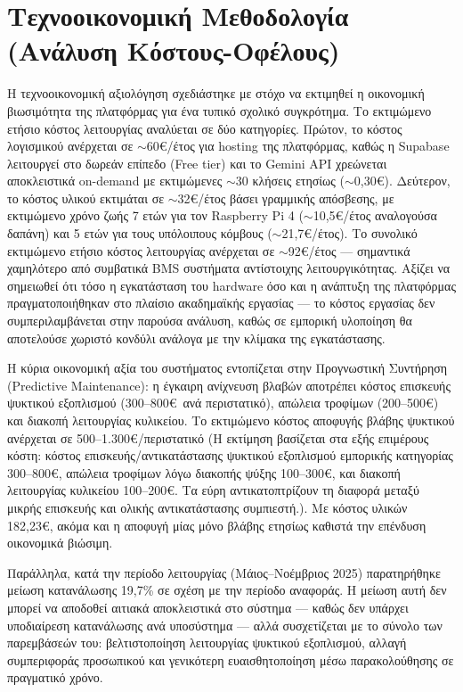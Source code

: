 \section{\texorpdfstring{Τεχνοοικονομική Μεθοδολογία (Ανάλυση Κόστους-Οφέλους)}{Τεχνοοικονομική Μεθοδολογία (Ανάλυση Κόστους-Οφέλους)}}
Η τεχνοοικονομική αξιολόγηση σχεδιάστηκε με στόχο να εκτιμηθεί η οικονομική βιωσιμότητα της πλατφόρμας για ένα τυπικό σχολικό συγκρότημα. Το εκτιμώμενο ετήσιο κόστος λειτουργίας αναλύεται σε δύο κατηγορίες. Πρώτον, το κόστος λογισμικού ανέρχεται σε $\sim$60\euro/έτος για \textlatin{hosting} της πλατφόρμας, καθώς η \textlatin{Supabase} λειτουργεί στο δωρεάν επίπεδο (\textlatin{Free tier}) και το \textlatin{Gemini API} χρεώνεται αποκλειστικά \textlatin{on-demand} με εκτιμώμενες $\sim$30 κλήσεις ετησίως ($\sim$0,30\euro). Δεύτερον, το κόστος υλικού εκτιμάται σε $\sim$32\euro/έτος βάσει γραμμικής απόσβεσης, με εκτιμώμενο χρόνο ζωής 7 ετών για τον \textlatin{Raspberry Pi 4} ($\sim$10,5\euro/έτος αναλογούσα δαπάνη) και 5 ετών για τους υπόλοιπους κόμβους ($\sim$21,7\euro/έτος). Το συνολικό εκτιμώμενο ετήσιο κόστος λειτουργίας ανέρχεται σε $\sim$92\euro/έτος --- σημαντικά χαμηλότερο από συμβατικά \textlatin{BMS} συστήματα αντίστοιχης λειτουργικότητας. Αξίζει να σημειωθεί ότι τόσο η εγκατάσταση του \textlatin{hardware} όσο και η ανάπτυξη της πλατφόρμας πραγματοποιήθηκαν στο πλαίσιο ακαδημαϊκής εργασίας --- το κόστος εργασίας δεν συμπεριλαμβάνεται στην παρούσα ανάλυση, καθώς σε εμπορική υλοποίηση θα αποτελούσε χωριστό κονδύλι ανάλογα με την κλίμακα της εγκατάστασης.

Η κύρια οικονομική αξία του συστήματος εντοπίζεται στην Προγνωστική Συντήρηση (\textlatin{Predictive Maintenance}): η έγκαιρη ανίχνευση βλαβών αποτρέπει κόστος επισκευής ψυκτικού εξοπλισμού (300--800\euro\ ανά περιστατικό), απώλεια τροφίμων (200--500\euro) και διακοπή λειτουργίας κυλικείου. Το εκτιμώμενο κόστος αποφυγής βλάβης ψυκτικού ανέρχεται σε 500--1.300\euro/περιστατικό (Η εκτίμηση βασίζεται στα εξής επιμέρους κόστη: κόστος επισκευής/αντικατάστασης ψυκτικού εξοπλισμού εμπορικής κατηγορίας 300--800\euro, απώλεια τροφίμων λόγω διακοπής ψύξης 100--300\euro, και διακοπή λειτουργίας κυλικείου 100--200\euro. Τα εύρη αντικατοπτρίζουν τη διαφορά μεταξύ μικρής επισκευής και ολικής αντικατάστασης συμπιεστή.). Με κόστος υλικών 182,23\euro, ακόμα και η αποφυγή μίας μόνο βλάβης ετησίως καθιστά την επένδυση οικονομικά βιώσιμη.

Παράλληλα, κατά την περίοδο λειτουργίας (Μάιος--Νοέμβριος 2025) παρατηρήθηκε μείωση κατανάλωσης 19,7\% σε σχέση με την περίοδο αναφοράς. Η μείωση αυτή δεν μπορεί να αποδοθεί αιτιακά αποκλειστικά στο σύστημα --- καθώς δεν υπάρχει υποδιαίρεση κατανάλωσης ανά υποσύστημα --- αλλά συσχετίζεται με το σύνολο των παρεμβάσεών του: βελτιστοποίηση λειτουργίας ψυκτικού εξοπλισμού, αλλαγή συμπεριφοράς προσωπικού και γενικότερη ευαισθητοποίηση μέσω παρακολούθησης σε πραγματικό χρόνο.

